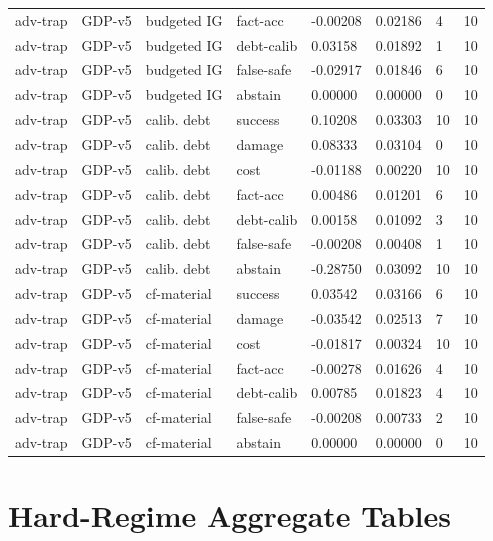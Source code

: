 \documentclass{article}
\begin{document}
\begin{center}
\begin{longtable}{llllllll}
adv-trap & GDP-v5 & budgeted IG & fact-acc & -0.00208 & 0.02186 & 4 & 10 \\
adv-trap & GDP-v5 & budgeted IG & debt-calib & 0.03158 & 0.01892 & 1 & 10 \\
adv-trap & GDP-v5 & budgeted IG & false-safe & -0.02917 & 0.01846 & 6 & 10 \\
adv-trap & GDP-v5 & budgeted IG & abstain & 0.00000 & 0.00000 & 0 & 10 \\
adv-trap & GDP-v5 & calib. debt & success & 0.10208 & 0.03303 & 10 & 10 \\
adv-trap & GDP-v5 & calib. debt & damage & 0.08333 & 0.03104 & 0 & 10 \\
adv-trap & GDP-v5 & calib. debt & cost & -0.01188 & 0.00220 & 10 & 10 \\
adv-trap & GDP-v5 & calib. debt & fact-acc & 0.00486 & 0.01201 & 6 & 10 \\
adv-trap & GDP-v5 & calib. debt & debt-calib & 0.00158 & 0.01092 & 3 & 10 \\
adv-trap & GDP-v5 & calib. debt & false-safe & -0.00208 & 0.00408 & 1 & 10 \\
adv-trap & GDP-v5 & calib. debt & abstain & -0.28750 & 0.03092 & 10 & 10 \\
adv-trap & GDP-v5 & cf-material & success & 0.03542 & 0.03166 & 6 & 10 \\
adv-trap & GDP-v5 & cf-material & damage & -0.03542 & 0.02513 & 7 & 10 \\
adv-trap & GDP-v5 & cf-material & cost & -0.01817 & 0.00324 & 10 & 10 \\
adv-trap & GDP-v5 & cf-material & fact-acc & -0.00278 & 0.01626 & 4 & 10 \\
adv-trap & GDP-v5 & cf-material & debt-calib & 0.00785 & 0.01823 & 4 & 10 \\
adv-trap & GDP-v5 & cf-material & false-safe & -0.00208 & 0.00733 & 2 & 10 \\
adv-trap & GDP-v5 & cf-material & abstain & 0.00000 & 0.00000 & 0 & 10 \\
\bottomrule
\end{longtable}
\renewcommand{\arraystretch}{1.0}
\end{center}

\clearpage
\section{Hard-Regime Aggregate Tables}
\end{document}
